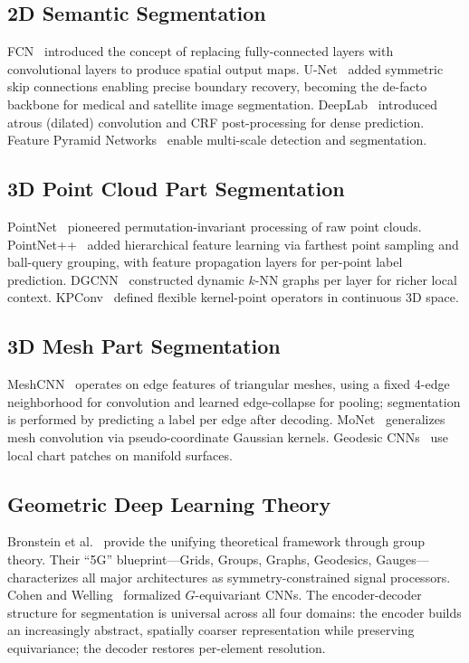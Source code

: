 \documentclass[10pt,conference]{IEEEtran}
\begin{document}
\subsection{2D Semantic Segmentation}

FCN~\cite{long2015fcn} introduced the concept of replacing fully-connected
layers with convolutional layers to produce spatial output maps.
U-Net~\cite{ronneberger2015unet} added symmetric skip connections enabling
precise boundary recovery, becoming the de-facto backbone for medical and
satellite image segmentation.  DeepLab~\cite{chen2017deeplab} introduced
atrous (dilated) convolution and CRF post-processing for dense prediction.
Feature Pyramid Networks~\cite{lin2017fpn} enable multi-scale detection and
segmentation.

\subsection{3D Point Cloud Part Segmentation}

PointNet~\cite{qi2017pointnet} pioneered permutation-invariant processing
of raw point clouds.  PointNet++~\cite{qi2017pointnetplusplus} added
hierarchical feature learning via farthest point sampling and ball-query
grouping, with feature propagation layers for per-point label prediction.
DGCNN~\cite{wang2019dgcnn} constructed dynamic $k$-NN graphs per layer for
richer local context.  KPConv~\cite{thomas2019kpconv} defined flexible
kernel-point operators in continuous 3D space.

\subsection{3D Mesh Part Segmentation}

MeshCNN~\cite{hanocka2019meshcnn} operates on edge features of triangular
meshes, using a fixed 4-edge neighborhood for convolution and learned
edge-collapse for pooling; segmentation is performed by predicting a label
per edge after decoding.  MoNet~\cite{monti2017geometric} generalizes mesh
convolution via pseudo-coordinate Gaussian kernels.  Geodesic
CNNs~\cite{masci2015geodesic} use local chart patches on manifold surfaces.

\subsection{Geometric Deep Learning Theory}

Bronstein et al.~\cite{bronstein2021geometric} provide the unifying
theoretical framework through group theory.  Their ``5G''
blueprint---Grids, Groups, Graphs, Geodesics, Gauges---characterizes all
major architectures as symmetry-constrained signal processors.  Cohen and
Welling~\cite{cohen2016group} formalized $G$-equivariant CNNs.  The encoder-decoder
structure for segmentation is universal across all four domains: the encoder
builds an increasingly abstract, spatially coarser representation while
preserving equivariance; the decoder restores per-element resolution.
\end{document}
